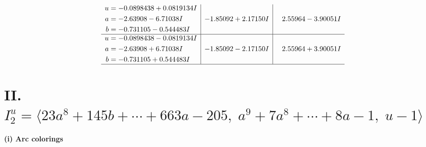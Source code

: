 \documentclass[1p]{elsarticle_modified}
\theoremstyle{definition}
\begin{document}
$$\begin{array}{c|c|c}
\begin{aligned}
u &= -0.0898438 + 0.0819134 I \\
a &= -2.63908 - 6.71038 I \\
b &= -0.731105 - 0.544483 I\end{aligned}
 & -1.85092 + 2.17150 I & \phantom{-}2.55964 - 3.90051 I \\ \hline\begin{aligned}
u &= -0.0898438 - 0.0819134 I \\
a &= -2.63908 + 6.71038 I \\
b &= -0.731105 + 0.544483 I\end{aligned}
 & -1.85092 - 2.17150 I & \phantom{-}2.55964 + 3.90051 I\\
 \hline 
 \end{array}$$\newpage\newpage\renewcommand{\arraystretch}{1}
\centering \section*{II. $I^u_{2}= \langle 23 a^8+145 b+\cdots+663 a-205,\;a^9+7 a^8+\cdots+8 a-1,\;u-1 \rangle$}
\flushleft \textbf{(i) Arc colorings}\\
\end{document}
